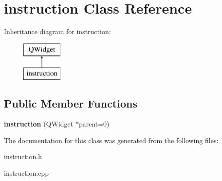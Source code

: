 \hypertarget{classinstruction}{}\section{instruction Class Reference}
\label{classinstruction}
Inheritance diagram for instruction\+:\begin{figure}[H]
\begin{center}
\leavevmode
\includegraphics[height=2.000000cm]{classinstruction}
\end{center}
\end{figure}
\subsection*{Public Member Functions}
\begin{DoxyCompactItemize}
\item 
\hypertarget{classinstruction_aef14793380b1853c6d0d1276c40d8f3c}{}{\bfseries instruction} (Q\+Widget $\ast$parent=0)\label{classinstruction_aef14793380b1853c6d0d1276c40d8f3c}

\end{DoxyCompactItemize}


The documentation for this class was generated from the following files\+:\begin{DoxyCompactItemize}
\item 
instruction.\+h\item 
instruction.\+cpp\end{DoxyCompactItemize}
